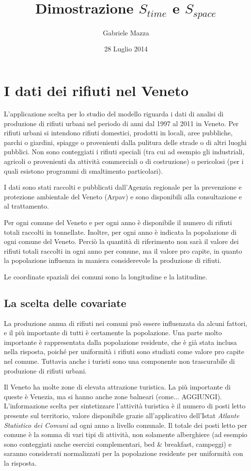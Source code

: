 \documentclass[a4paper,11pt,twoside,openright]{book}							%
\date{28 Luglio 2014}
\author{Gabriele Mazza}
\title{Dimostrazione $S_{time}$ e $S_{space}$}
\begin{document}

\chapter{I dati dei rifiuti nel Veneto}


L'applicazione scelta per lo studio del modello riguarda i dati di analisi di produzione di rifiuti urbani nel periodo di anni dal 1997 al 2011 in Veneto. Per rifiuti urbani si intendono rifiuti domestici, prodotti in locali, aree pubbliche, parchi o giardini, spiagge o provenienti dalla pulitura delle strade o di altri luoghi pubblici. Non sono conteggiati i rifiuti speciali (tra cui ad esempio gli industriali, agricoli o provenienti da attività commerciali o di costruzione) o pericolosi (per i quali esistono programmi di smaltimento particolari).

I dati sono stati raccolti e pubblicati dall'Agenzia regionale per la prevenzione e protezione ambientale del Veneto (Arpav) e sono disponibili alla consultazione e al trattamento.

Per ogni comune del Veneto e per ogni anno è disponibile il numero di rifiuti totali raccolti in tonnellate. Inoltre, per ogni anno è indicata la popolazione di ogni comune del Veneto. Perciò la quantità di riferimento non sarà il valore dei rifiuti totali raccolti in ogni anno per comune, ma il valore pro capite, in quanto la popolazione influenza in maniera considerevole la produzione di rifiuti.

Le coordinate spaziali dei comuni sono la longitudine e la latitudine.

\section{La scelta delle covariate}

La produzione annua di rifiuti nei comuni può essere influenzata da alcuni fattori, e il più importante di tutti è certamente la popolazione. Una parte molto importante è rappresentata dalla popolazione residente, che è già stata inclusa nella risposta, poiché per uniformità i rifiuti sono studiati come valore pro capite nel comune. Tuttavia anche i turisti sono una componente non trascurabile di produzione di rifiuti urbani.

Il Veneto ha molte zone di elevata attrazione turistica. La più importante di queste è Venezia, ma si hanno anche zone balneari (come... AGGIUNGI). L'informazione scelta per sintetizzare l'attività turistica è il numero di posti letto presente sul territorio, valore disponibile grazie all'applicativo dell'Istat \textit{Atlante Statistico dei Comuni} ad ogni anno a livello comunale. Il totale dei posti letto per comune è la somma di vari tipi di attività, non solamente alberghiere (ad esempio sono conteggiati anche esercizi complementari, bed \& breakfast, campeggi) e saranno considerati normalizzati per la popolazione residente per uniformità con la risposta.
\end{document}
